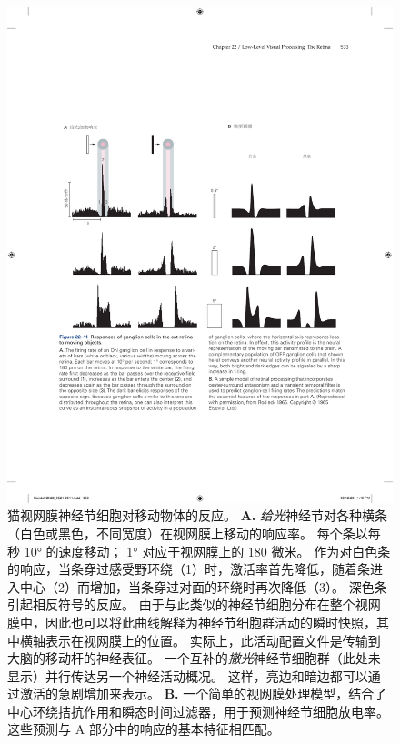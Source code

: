 \begin{figure}[htbp]
	\centering
	\includegraphics[width=1.0\linewidth]{chap22/fig_22_11}
	\caption{猫视网膜神经节细胞对移动物体的反应。 
		\textbf{A.} \textit{给光}神经节对各种横条（白色或黑色，不同宽度）在视网膜上移动的响应率。 
		每个条以每秒 10° 的速度移动； 1° 对应于视网膜上的 180 微米。
		作为对白色条的响应，当条穿过感受野环绕（1）时，激活率首先降低，随着条进入中心（2）而增加，当条穿过对面的环绕时再次降低（3）。
		深色条引起相反符号的反应。 
		由于与此类似的神经节细胞分布在整个视网膜中，因此也可以将此曲线解释为神经节细胞群活动的瞬时快照，其中横轴表示在视网膜上的位置。 
		实际上，此活动配置文件是传输到大脑的移动杆的神经表征。 
		一个互补的\textit{撤光}神经节细胞群（此处未显示）并行传达另一个神经活动概况。 这样，亮边和暗边都可以通过激活的急剧增加来表示。 
		\textbf{B.} 一个简单的视网膜处理模型，结合了中心环绕拮抗作用和瞬态时间过滤器，用于预测神经节细胞放电率。 
		这些预测与 A 部分中的响应的基本特征相匹配。}
	\label{fig:22_11}
\end{figure}


